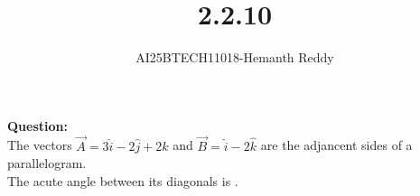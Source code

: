\documentclass[journal]{IEEEtran}
\begin{document}

\vspace{3cm}

\title{2.2.10}
\author{AI25BTECH11018-Hemanth Reddy}
 \maketitle
{\let\newpage\relax\maketitle}

\renewcommand{\thefigure}{\theenumi}
\renewcommand{\thetable}{\theenumi}
\setlength{\intextsep}{10pt} %


\renewcommand{\thetable}{\theenumi}

\textbf{Question:}\\
The vectors $\vec{A} = 3\hat{i} - 2\hat{j} + 2\hat{k}$ and $\vec{B} = \hat{i} - 2\hat{k}$ are the adjancent sides of a parallelogram. \\
The acute angle between its diagonals is \underline{\hspace{2cm}}.\\
\end{document}
